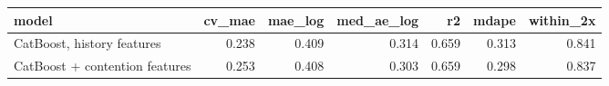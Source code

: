 \begin{tabular}{lrrrrrr}
\toprule
model & cv_mae & mae_log & med_ae_log & r2 & mdape & within_2x \\
\midrule
CatBoost, history features & 0.238 & 0.409 & 0.314 & 0.659 & 0.313 & 0.841 \\
CatBoost + contention features & 0.253 & 0.408 & 0.303 & 0.659 & 0.298 & 0.837 \\
\bottomrule
\end{tabular}
